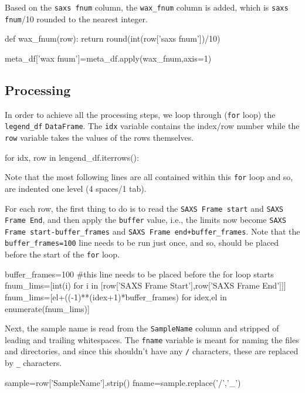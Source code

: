 \documentclass{article}
\begin{document}
Based on the \texttt{saxs fnum} column, the \texttt{wax\_fnum} column is added, which is \texttt{saxs fnum}/10 rounded to the nearest integer.

\begin{pythoncode}
def wax_fnum(row):
    return round(int(row['saxs fnum'])/10)

meta_df['wax fnum']=meta_df.apply(wax_fnum,axis=1)
\end{pythoncode}

\subsection{Processing}

In order to achieve all the processing steps, we loop through (\texttt{for} loop) the \texttt{legend\_df} \texttt{DataFrame}. The \texttt{idx} variable contains the index/row number while the \texttt{row} variable takes the values of the rows themselves.

\begin{pythoncode}
for idx, row in lengend_df.iterrows():
\end{pythoncode}

Note that the most following lines are all contained within this \texttt{for} loop and so, are indented one level (4 spaces/1 tab).

For each row, the first thing to do is to read the \texttt{SAXS Frame start} and \texttt{SAXS Frame End}, and then apply the \texttt{buffer} value, i.e., the limits now become \texttt{SAXS Frame start-buffer\_frames} and \texttt{SAXS Frame end+buffer\_frames}. Note that the \texttt{buffer\_frames=100} line needs to be run just once, and so, should be placed before the start of the \texttt{for} loop.

\begin{pythoncode}
buffer_frames=100 #this line needs to be placed before the for loop starts
  fnum_lims=[int(i) for i in [row['SAXS Frame Start'],row['SAXS Frame End']]]
  fnum_lims=[el+((-1)**(idex+1)*buffer_frames) for idex,el in enumerate(fnum_lims)]
\end{pythoncode}

Next, the sample name is read from the \texttt{SampleName} column and stripped of leading and trailing whitespaces. The \texttt{fname} variable is meant for naming the files and directories, and since this shouldn't have any \texttt{/} characters, these are replaced by \texttt{\_} characters.

\begin{pythoncode}
  sample=row['SampleName'].strip()
  fname=sample.replace('/','_')
\end{pythoncode}
\end{document}
